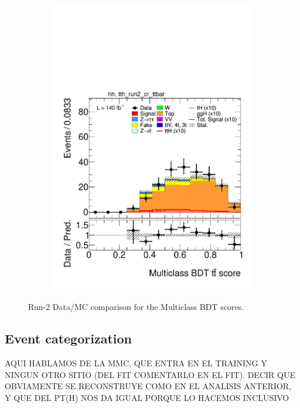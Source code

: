 \begin{figure}[htbp]
\begin{subfigure}[b]{0.49\textwidth}
    \includegraphics[width=\textwidth]{images/plots_modelling_run2_run3_variables/run_2_tth/plot_tth_th_multiclass_ttbar_hh_tth_run2_cr_ttbar_15_16_17_18.pdf}
    \caption{}
    \label{fig:overtrain_bkg}
  \end{subfigure}

  \caption{Run-2 Data/MC comparison for the Multiclass BDT scores.}
  \label{scores_modelling}
\end{figure}


\subsection{Event categorization}
\label{new_categorization}

AQUI HABLAMOS DE LA MMC, QUE ENTRA EN EL TRAINING Y NINGUN OTRO SITIO (DEL FIT COMENTARLO EN EL FIT).
DECIR QUE OBVIAMENTE SE RECONSTRUYE COMO EN EL ANALISIS ANTERIOR, Y QUE DEL PT(H) NOS DA IGUAL PORQUE LO HACEMOS INCLUSIVO 
